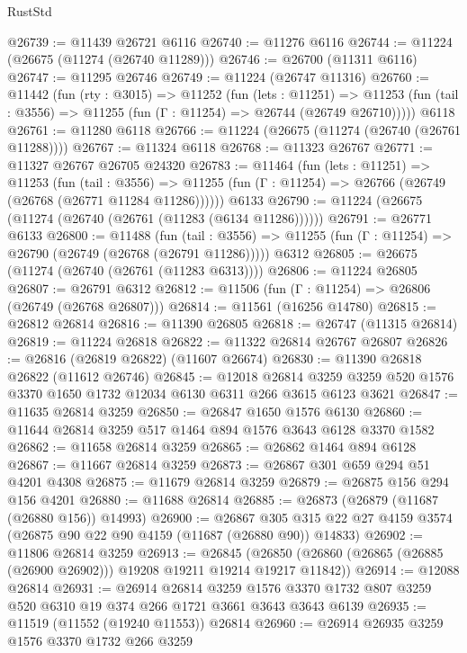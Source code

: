 \begin{lexlean}{RustStd}
\begin{coremodule}
@26739 := @11439 @26721 @6116
@26740 := @11276 @6116
@26744 := @11224 (@26675 (@11274 (@26740 @11289)))
@26746 := @26700 (@11311 @6116)
@26747 := @11295 @26746
@26749 := @11224 (@26747 @11316)
@26760 := @11442
    (fun (rty : @3015) =>
    @11252
      (fun (lets : @11251) =>
      @11253 (fun (tail : @3556) => @11255 (fun (Γ : @11254) => @26744 (@26749 @26710)))))
    @6118
@26761 := @11280 @6118
@26766 := @11224 (@26675 (@11274 (@26740 (@26761 @11288))))
@26767 := @11324 @6118
@26768 := @11323 @26767
@26771 := @11327 @26767 @26705 @24320
@26783 := @11464
    (fun (lets : @11251) =>
    @11253
      (fun (tail : @3556) =>
      @11255 (fun (Γ : @11254) => @26766 (@26749 (@26768 (@26771 @11284 @11286))))))
    @6133
@26790 := @11224 (@26675 (@11274 (@26740 (@26761 (@11283 (@6134 @11286))))))
@26791 := @26771 @6133
@26800 := @11488
    (fun (tail : @3556) => @11255 (fun (Γ : @11254) => @26790 (@26749 (@26768 (@26791 @11286)))))
    @6312
@26805 := @26675 (@11274 (@26740 (@26761 (@11283 @6313))))
@26806 := @11224 @26805
@26807 := @26791 @6312
@26812 := @11506 (fun (Γ : @11254) => @26806 (@26749 (@26768 @26807)))
@26814 := @11561 (@16256 @14780)
@26815 := @26812 @26814
@26816 := @11390 @26805
@26818 := @26747 (@11315 @26814)
@26819 := @11224 @26818
@26822 := @11322 @26814 @26767 @26807
@26826 := @26816 (@26819 @26822) (@11607 @26674)
@26830 := @11390 @26818 @26822 (@11612 @26746)
@26845 := @12018
    @26814
    @3259
    @3259
    @520
    @1576
    @3370
    @1650
    @1732
    @12034
    @6130
    @6311
    @266
    @3615
    @6123
    @3621
@26847 := @11635 @26814 @3259
@26850 := @26847 @1650 @1576 @6130
@26860 := @11644 @26814 @3259 @517 @1464 @894 @1576 @3643 @6128 @3370 @1582
@26862 := @11658 @26814 @3259
@26865 := @26862 @1464 @894 @6128
@26867 := @11667 @26814 @3259
@26873 := @26867 @301 @659 @294 @51 @4201 @4308
@26875 := @11679 @26814 @3259
@26879 := @26875 @156 @294 @156 @4201
@26880 := @11688 @26814
@26885 := @26873 (@26879 (@11687 (@26880 @156)) @14993)
@26900 := @26867
    @305
    @315
    @22
    @27
    @4159
    @3574
    (@26875 @90 @22 @90 @4159 (@11687 (@26880 @90)) @14833)
@26902 := @11806 @26814 @3259
@26913 := @26845
    (@26850 (@26860 (@26865 (@26885 (@26900 @26902))) @19208 @19211 @19214 @19217 @11842))
@26914 := @12088 @26814
@26931 := @26914
    @26814
    @3259
    @1576
    @3370
    @1732
    @807
    @3259
    @520
    @6310
    @19
    @374
    @266
    @1721
    @3661
    @3643
    @3643
    @6139
@26935 := @11519 (@11552 (@19240 @11553)) @26814
@26960 := @26914
    @26935
    @3259
    @1576
    @3370
    @1732
    @266
    @3259

\end{coremodule}
\end{lexlean}
